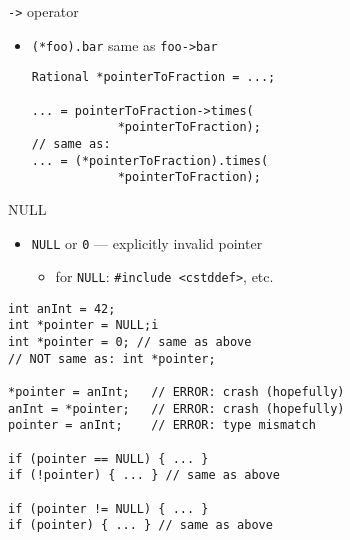 

\begin{frame}[fragile,label=arrowOp]{\texttt{-\textgreater} operator}
    \begin{itemize}
        \item \lstinline|(*foo).bar| same as \lstinline|foo->bar|
\begin{lstlisting}
Rational *pointerToFraction = ...;

... = pointerToFraction->times(
            *pointerToFraction);
// same as:
... = (*pointerToFraction).times(
            *pointerToFraction);
\end{lstlisting}
    \end{itemize}
\end{frame}


\begin{frame}[fragile,label=NULL]{NULL}
\begin{itemize}
\item \verb|NULL| or \verb|0| --- explicitly invalid pointer
    \begin{itemize}
    \item for {\tt NULL}: \lstinline|#include <cstddef>|, etc.
    \end{itemize}
\end{itemize}
\begin{lstlisting}
int anInt = 42;
int *pointer = NULL;i
int *pointer = 0; // same as above
// NOT same as: int *pointer;

*pointer = anInt;   // ERROR: crash (hopefully)
anInt = *pointer;   // ERROR: crash (hopefully)
pointer = anInt;    // ERROR: type mismatch

if (pointer == NULL) { ... }
if (!pointer) { ... } // same as above

if (pointer != NULL) { ... }
if (pointer) { ... } // same as above
\end{lstlisting}
\end{frame}

